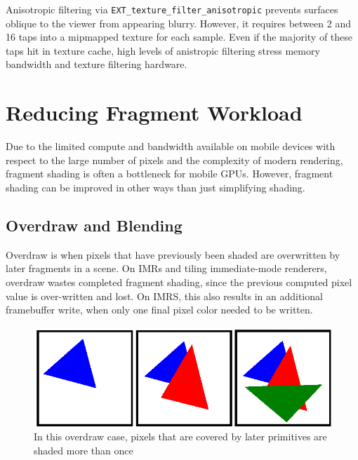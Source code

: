 Anisotropic filtering via \texttt{EXT\_texture\_filter\_anisotropic} prevents
surfaces oblique to the viewer from appearing blurry.  However, it requires
between 2 and 16 taps into a mipmapped texture for each sample.  Even if the
majority of these taps hit in texture cache, high levels of anistropic
filtering stress memory bandwidth and texture filtering hardware.

\section{Reducing Fragment Workload}
\label{Jon-McCaffrey-Reducing-Fragment-Workload}


Due to the limited compute and bandwidth available on mobile devices with
respect to the large number of pixels and the complexity of modern rendering,
fragment shading is often a bottleneck for mobile GPUs.  However, fragment
shading can be improved in other ways than just simplifying shading.

\subsection{Overdraw and Blending}\label{Jon-McCaffrey-Overdraw-And-Blending}
Overdraw is when pixels that have previously been shaded are overwritten by
later fragments in a scene.  On IMRs and tiling immediate-mode renderers,
overdraw wastes completed fragment
 shading, since the previous computed pixel
value is over-written and lost.
 On IMRS, this also results in an additional
framebuffer write, when only one final pixel
 color needed to be written.

\begin{figure}[h!]
    \caption{In this overdraw case, pixels that are covered by later primitives are shaded more than once}
    \centering
        \includegraphics{mccaffreyFigs/default_order.eps}
\end{figure}


